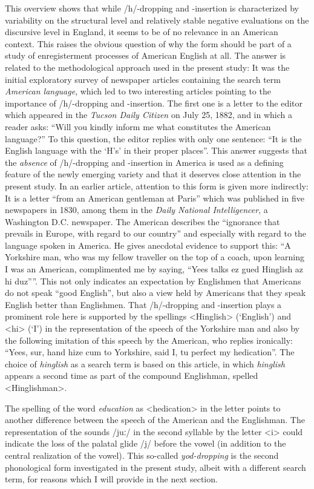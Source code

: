 This overview shows that while /h/-dropping and -insertion is characterized by variability on the structural level and relatively stable negative evaluations on the discursive level in England, it seems to be of no relevance in an American context. This raises the obvious question of why the form should be part of a study of enregisterment processes of American English at all. The answer is related to the methodological approach used in the present study: It was the initial exploratory survey of newspaper articles containing the search term \emph{American language}{, which} led to two interesting articles pointing to the importance of /h/-dropping and -insertion. The first one is a letter to the editor which appeared in the \emph{Tucson Daily Citizen} on July 25, 1882, and in which a reader asks: “Will you kindly inform me what constitutes the American language?” To this question, the editor replies with only one sentence: “It is the English language with the ‘H’s’ in their proper places”. This answer suggests that the \emph{absence} of /h/-dropping and -insertion in America is used as a defining feature of the newly emerging variety and that it deserves close attention in the present study. In an earlier article, attention to this form is given more indirectly: It is a letter “from an American gentleman at Paris” which was published in five newspapers in 1830, among them in the \emph{Daily National Intelligencer}, a Washington D.C. newspaper. The American describes the “ignorance that prevails in Europe, with regard to our country” and especially with regard to the language spoken in America. He gives anecdotal evidence to support this: “A Yorkshire man, who was my fellow traveller on the top of a coach, upon learning I was an American, complimented me by saying, “Yees talks ez gued Hinglish az hi duz””. This not only indicates an expectation by Englishmen that Americans do not speak “good English”, but also a view held by Americans that they speak English better than Englishmen. That /h/-dropping and -insertion plays a prominent role here is supported by the spellings <Hinglish> (‘English’) and <hi> (‘I’) in the representation of the speech of the Yorkshire man and also by the following imitation of this speech by the American, who replies ironically: “Yees, sur, hand hize cum to Yorkshire, said I, tu perfect my hedication”. The choice of \textit{hinglish} as a search term is based on this article, in which \textit{hinglish} appears a second time as part of the compound Englishman, spelled <Hinglishman>.

The spelling of the word \textit{education} as <hedication> in the letter points to another difference between the speech of the American and the Englishman. The representation of the sounds /juː/ in the second syllable by the letter <i> could indicate the loss of the palatal glide /j/ before the vowel (in addition to the central realization of the vowel). This so-called \textit{yod-dropping} is the second phonological form investigated in the present study, albeit with a different search term, for reasons which I will provide in the next section.

